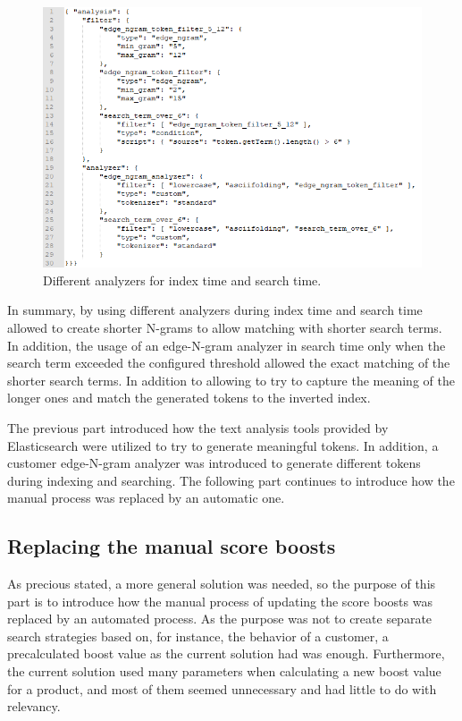 \begin{figure}
    \centering
    \includegraphics[width=\textwidth]{img/new-analyzer.png}
    \caption{Different analyzers for index time and search time.}
    \label{fig:new-analyzer}
\end{figure}

In summary, by using different analyzers during index time and search time allowed to create shorter N-grams to allow
matching with shorter search terms. 
In addition, the usage of an edge-N-gram analyzer in search time only when the search term exceeded the configured
threshold allowed the exact matching of the shorter search terms.
In addition to allowing to try to capture the meaning of the longer ones and match the generated tokens to the inverted index.


The previous part introduced how the text analysis tools provided by Elasticsearch 
were utilized to try to generate meaningful tokens.
In addition, a customer edge-N-gram analyzer was introduced to generate different tokens during indexing and searching.
The following part continues to introduce how the manual process was replaced by an automatic one.


\subsection{Replacing the manual score boosts}


As precious stated, a more general solution was needed, so the purpose of this part is to
introduce how the manual process of updating the score boosts was replaced by an automated process.
As the purpose was not to create separate search strategies based on, for instance, the behavior of a customer, 
a precalculated boost value as the current solution had was enough.
Furthermore, the current solution used many parameters when calculating a new boost value for a product, and 
most of them seemed unnecessary and had little to do with relevancy.

